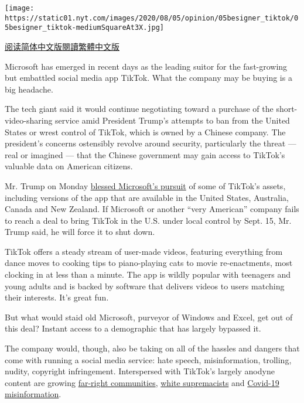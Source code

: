 \texttt{[image: https://static01.nyt.com/images/2020/08/05/opinion/05besigner\_tiktok/05besigner\_tiktok-mediumSquareAt3X.jpg]}

\href{https://cn.nytimes.com/opinion/20200805/tiktok-microsoft-trump/}{阅读简体中文版}\href{https://cn.nytimes.com/opinion/20200805/tiktok-microsoft-trump/zh-hant/}{閱讀繁體中文版}

Microsoft has emerged in recent days as the leading suitor for the
fast-growing but embattled social media app TikTok. What the company may
be buying is a big headache.

The tech giant said it would continue negotiating toward a purchase of
the short-video-sharing service amid President Trump's attempts to ban
from the United States or wrest control of TikTok, which is owned by a
Chinese company. The president's concerns ostensibly revolve around
security, particularly the threat --- real or imagined --- that the
Chinese government may gain access to TikTok's valuable data on American
citizens.

Mr. Trump on Monday
\href{https://www.nytimes.com/2020/08/03/technology/trump-tiktok-microsoft.html}{blessed
Microsoft's pursuit} of some of TikTok's assets, including versions of
the app that are available in the United States, Australia, Canada and
New Zealand. If Microsoft or another ``very American'' company fails to
reach a deal to bring TikTok in the U.S. under local control by Sept.
15, Mr. Trump said, he will force it to shut down.

TikTok offers a steady stream of user-made videos, featuring everything
from dance moves to cooking tips to piano-playing cats to movie
re-enactments, most clocking in at less than a minute. The app is wildly
popular with teenagers and young adults and is backed by software that
delivers videos to users matching their interests. It's great fun.

But what would staid old Microsoft, purveyor of Windows and Excel, get
out of this deal? Instant access to a demographic that has largely
bypassed it.

The company would, though, also be taking on all of the hassles and
dangers that come with running a social media service: hate speech,
misinformation, trolling, nudity, copyright infringement. Interspersed
with TikTok's largely anodyne content are growing
\href{https://www.huffpost.com/entry/far-right-tiktok-gen-z_n_5cb63040e4b082aab08da0d3}{far-right
communities},
\href{https://www.vice.com/en_us/article/yw74gy/tiktok-neo-nazis-white-supremacy}{white
supremacists} and
\href{https://www.rollingstone.com/culture/culture-features/tiktok-conspiracy-theories-bill-gates-microchip-vaccine-996394/}{Covid-19
misinformation}.

